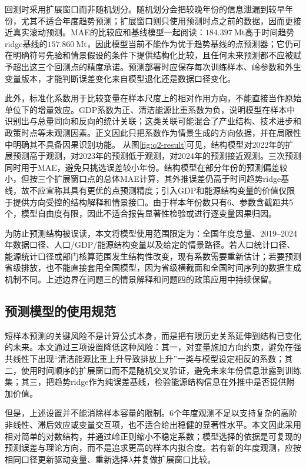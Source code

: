 \documentclass[12pt,a4paper]{ctexart}
\theoremstyle{definition}
\theoremstyle{plain}
\theoremstyle{remark}
\begin{document}
回测时采用扩展窗口而非随机划分。随机划分会把较晚年份的信息泄漏到较早年份，尤其不适合年度趋势预测；扩展窗口则只使用预测时点之前的数据，因而更接近真实滚动预测。MAE的比较应和基线模型一起阅读：$184.397\ \mathrm{Mt}$高于时间趋势ridge基线的$157.860\ \mathrm{Mt}$，因此模型当前不能作为优于趋势基线的点预测器；它仍可在明确符号先验和情景假设的条件下提供结构化比较，且任何未来预测都不应被赋予超出这三个回测点的精度承诺。预测部署时应保存每次训练样本、岭参数和外生变量版本，才能判断误差变化来自模型退化还是数据口径变化。

此外，标准化系数用于比较变量在样本尺度上的相对作用方向，不能直接当作原始单位下的增量效应。GDP系数为正、清洁能源比重系数为负，说明模型在样本中识别出与总量同向和反向的统计关联；这类关联可能混合了产业结构、技术进步和政策时点等未观测因素。正文因此只把系数作为情景生成的方向依据，并在局限性中明确其不具备因果识别功能。
从图\ref{fig:q2-result}可见，结构模型对2022年的扩展预测高于观测，对2023年的预测低于观测，对2024年的预测接近观测。三次预测同时用于MAE，避免只挑选误差较小年份。结构模型在部分年份的预测偏差较小，但按三个扩展窗口点的总体MAE计算，其外推误差仍高于时间趋势ridge基线，故不应宣称其具有更优的点预测精度；引入GDP和能源结构变量的价值仅限于提供方向受控的结构解释和情景接口。由于样本年份数只有6、参数含截距共5个，模型自由度有限，因此不适合报告显著性检验或进行逐变量因果归因。

为防止预测结构被误读，本文将模型使用范围限定为：全国年度总量、2019--2024年数据口径、人口/GDP/能源结构变量以及给定的情景路径。若人口统计口径、能源统计口径或部门核算范围发生结构性改变，现有系数需要重新估计；若要预测省级排放，也不能直接套用全国模型，因为省级横截面和全国时间序列的数据生成机制不同。上述边界在问题三的情景解释和问题四的政策应用中持续保留。
\subsection{预测模型的使用规范}
短样本预测的关键风险不是计算公式本身，而是把有限历史关系延伸到结构已变化的未来。本文通过三项设置降低这种风险：其一，对变量施加方向约束，避免在强共线性下出现“清洁能源比重上升导致排放上升”一类与模型设定相反的系数；其二，使用时间顺序的扩展窗口而不是随机交叉验证，避免未来年份信息泄露到训练集；其三，把趋势ridge作为纯误差基线，检验能源结构信息在外推中是否提供附加价值。

但是，上述设置并不能消除样本容量的限制。6个年度观测不足以支持复杂的高阶非线性、滞后效应或变量交互项，也不适合给出稳健的显著性水平。本文因此采用相对简单的对数结构，并通过岭正则缩小不稳定系数；模型选择的依据是可复现的预测误差与理论方向，而不是追求更高的样本内拟合度。若有新的年度观测，应按相同口径更新驱动变量、重新选择$\lambda$并复做扩展窗口比较。
\end{document}
